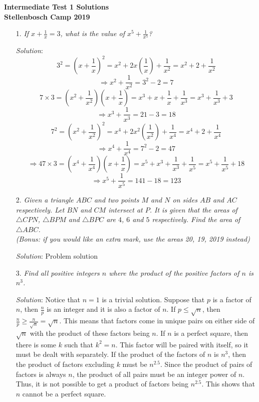 \documentclass{article}
\begin{document}
\begin{center}
  \textbf{\Large Intermediate Test 1 Solutions}
  \\ \vspace{1em}
  \textbf{\large Stellenbosch Camp 2019}
\end{center}


\begin{enumerate}[1.]

\item[1.] %
\textit{If $x + \frac{1}{x} = 3$, what is the value of $x^5 + \frac{1}{x^5}$?}

\textit{Solution}: 
$$3^2 = (x + \frac{1}{x})^2 = x^2 + 2x(\frac{1}{x}) + \frac{1}{x^2} = x^2 + 2 + \frac{1}{x^2}$$
$$\Rightarrow x^2 + \frac{1}{x^2} = 3^2 - 2 = 7$$
$$7 \times 3 = (x^2 + \frac{1}{x^2})(x + \frac{1}{x}) = x^3 + x + \frac{1}{x} + \frac{1}{x^3} = x^3 + \frac{1}{x^3} + 3$$
$$\Rightarrow x^3 + \frac{1}{x^3} = 21 - 3 = 18$$
$$7^2 = (x^2 + \frac{1}{x^2})^2 = x^4 + 2x^2(\frac{1}{x^2}) + \frac{1}{x^4} = x^4 + 2 + \frac{1}{x^4}$$
$$\Rightarrow x^4 + \frac{1}{x^4} = 7^2 - 2 = 47$$
$$\Rightarrow 47 \times 3 = (x^4 + \frac{1}{x^4})(x + \frac{1}{x}) = x^5 + x^3 + \frac{1}{x^3} + \frac{1}{x^5} = x^5 + \frac{1}{x^5} + 18$$
$$\Rightarrow x^5 + \frac{1}{x^5} = 141 - 18 = 123$$


\item[2.] %
\textit{Given a triangle $ABC$ and two points $M$ and $N$ on sides $AB$ and $AC$ respectively. Let $BN$ and $CM$ intersect at $P$. It is given that the areas of $\triangle CPN$, $\triangle BPM$ and $\triangle BPC$ are $4$, $6$ and $5$ respectively.
Find the area of $\triangle ABC$.\\
(Bonus: if you would like an extra mark, use the areas 20, 19, 2019 instead)}

\textit{Solution}: Problem solution



\item[3.] %
\textit{Find all positive integers $n$ where the product of the positive factors of $n$ is $n^3$.}

\textit{Solution}: Notice that $n = 1$ is a trivial solution. Suppose that $p$ is a factor of $n$, then $\frac{n}{p}$ is an integer and it is also a factor of $n$. If $p \le \sqrt{n}$, then $\frac{n}{p} \ge \frac{n}{\sqrt{n}} = \sqrt{n}$.
This means that factors come in unique pairs on either side of $\sqrt{n}$ with the product of these factors being $n$. If $n$ is a perfect square, then there is some $k$ such that $k^2 = n$. This factor will be paired with itself, so it must be dealt with separately.
If the product of the factors of $n$ is $n^3$, then the product of factors excluding $k$ must be $n^{2.5}$. Since the product of pairs of factors is always $n$, the product of all pairs must be an integer power of $n$. Thus, it is not possible to get a product of factors being $n^{2.5}$. This shows that $n$ cannot be a perfect square.\\


\end{enumerate}
\end{document}

